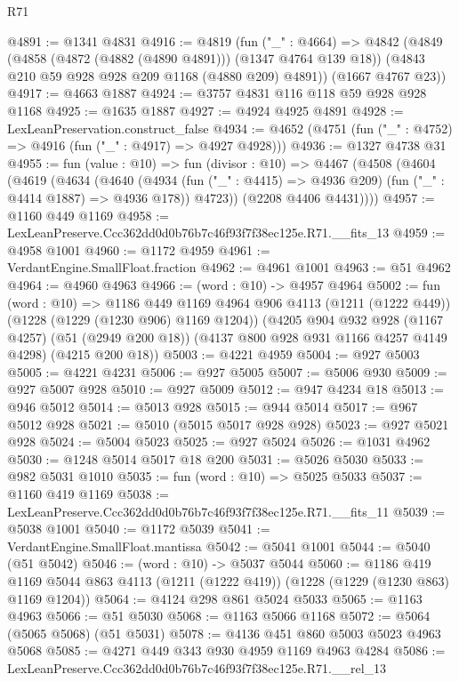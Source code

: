 \begin{lexlean}{R71}
\begin{coremodule}
@4891 := @1341 @4831
@4916 := @4819
    (fun ("_" : @4664) =>
    @4842
      (@4849
        (@4858 (@4872 (@4882 (@4890 @4891))) (@1347 @4764 @139 @18))
        (@4843 @210 @59 @928 @928 @209 @1168 (@4880 @209) @4891))
      (@1667 @4767 @23))
@4917 := @4663 @1887
@4924 := @3757 @4831 @116 @118 @59 @928 @928 @1168
@4925 := @1635 @1887
@4927 := @4924 @4925 @4891
@4928 := LexLeanPreservation.construct_false
@4934 := @4652 (@4751 (fun ("_" : @4752) => @4916 (fun ("_" : @4917) => @4927 @4928)))
@4936 := @1327 @4738 @31
@4955 := fun (value : @10) =>
  fun (divisor : @10) =>
  @4467
    (@4508
      (@4604
        (@4619
          (@4634
            (@4640
              (@4934 (fun ("_" : @4415) => @4936 @209) (fun ("_" : @4414 @1887) => @4936 @178))
              @4723))
          (@2208 @4406 @4431))))
@4957 := @1160 @449 @1169
@4958 := LexLeanPreserve.Ccc362dd0d0b76b7c46f93f7f38ec125e.R71.__fits_13
@4959 := @4958 @1001
@4960 := @1172 @4959
@4961 := VerdantEngine.SmallFloat.fraction
@4962 := @4961 @1001
@4963 := @51 @4962
@4964 := @4960 @4963
@4966 := (word : @10) -> @4957 @4964
@5002 := fun (word : @10) =>
  @1186
    @449
    @1169
    @4964
    @906
    @4113
    (@1211 (@1222 @449))
    (@1228 (@1229 (@1230 @906) @1169 @1204))
    (@4205
      @904
      @932
      @928
      (@1167 @4257)
      (@51 (@2949 @200 @18))
      (@4137 @800 @928 @931 @1166 @4257 @4149 @4298)
      (@4215 @200 @18))
@5003 := @4221 @4959
@5004 := @927 @5003
@5005 := @4221 @4231
@5006 := @927 @5005
@5007 := @5006 @930
@5009 := @927 @5007 @928
@5010 := @927 @5009
@5012 := @947 @4234 @18
@5013 := @946 @5012
@5014 := @5013 @928
@5015 := @944 @5014
@5017 := @967 @5012 @928
@5021 := @5010 (@5015 @5017 @928 @928)
@5023 := @927 @5021 @928
@5024 := @5004 @5023
@5025 := @927 @5024
@5026 := @1031 @4962
@5030 := @1248 @5014 @5017 @18 @200
@5031 := @5026 @5030
@5033 := @982 @5031 @1010
@5035 := fun (word : @10) => @5025 @5033
@5037 := @1160 @419 @1169
@5038 := LexLeanPreserve.Ccc362dd0d0b76b7c46f93f7f38ec125e.R71.__fits_11
@5039 := @5038 @1001
@5040 := @1172 @5039
@5041 := VerdantEngine.SmallFloat.mantissa
@5042 := @5041 @1001
@5044 := @5040 (@51 @5042)
@5046 := (word : @10) -> @5037 @5044
@5060 := @1186
    @419
    @1169
    @5044
    @863
    @4113
    (@1211 (@1222 @419))
    (@1228 (@1229 (@1230 @863) @1169 @1204))
@5064 := @4124 @298 @861 @5024 @5033
@5065 := @1163 @4963
@5066 := @51 @5030
@5068 := @1163 @5066 @1168
@5072 := @5064 (@5065 @5068) (@51 @5031)
@5078 := @4136 @451 @860 @5003 @5023 @4963 @5068
@5085 := @4271 @449 @343 @930 @4959 @1169 @4963 @4284
@5086 := LexLeanPreserve.Ccc362dd0d0b76b7c46f93f7f38ec125e.R71.__rel_13

\end{coremodule}
\end{lexlean}
